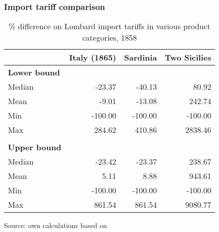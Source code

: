 \documentclass[10pt]{beamer}
\begin{document}
\begin{frame}[label = tariff_rates]
    \frametitle{Import tariff comparison}

\begin{table}[!h]
\caption{\% difference on Lombard import tariffs in various product categories, 1858}
\centering
\fontsize{8}{8}\selectfont

    \begin{tabular}{l r r r}  
        \toprule
         & Italy (1865) & Sardinia & Two Sicilies \\ 
        \midrule
        \textbf{Lower bound} \\
        Median  & -23.37 & -40.13 & 80.92  \\
        Mean    & -9.01 & -13.08 & 242.74    \\
        Min & -100.00 & -100.00 & -100.00 \\
        Max & 284.62 & 410.86 & 2838.46 \\
        \\
        \textbf{Upper bound} \\
        Median  & -23.42 & -23.37 & 238.67 \\
        Mean    & 5.11 & 8.88 & 943.61    \\
        Min & -100.00 & -100.00 & -100.00 \\
        Max & 861.54 & 861.54 & 9080.77 \\
        \bottomrule    
    \end{tabular}
    
    Source: own calculations based on \cite[][pp. 132 ff.]{cappellari1866}

\end{table}

\hyperlink{trade_comparison}{}
   
\end{frame}
\end{document}
